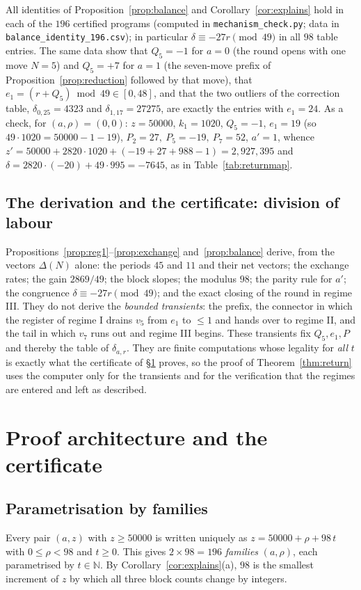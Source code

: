 \documentclass[11pt,a4paper]{article}
\theoremstyle{definition}
\newcommand{\N}{\mathbb{N}}
\begin{document}
All identities of Proposition~\ref{prop:balance} and Corollary~\ref{cor:explains} hold in each of the $196$ certified programs (computed in \texttt{mechanism\_check.py}; data in \texttt{balance\_identity\_196.csv}); in particular $\delta\equiv-27r\pmod{49}$ in all $98$ table entries. The same data show that $Q_5=-1$ for $a=0$ (the round opens with one move $N=5$) and $Q_5=+7$ for $a=1$ (the seven-move prefix of Proposition~\ref{prop:reduction} followed by that move), that $e_1=(r+Q_5)\bmod49\in[0,48]$, and that the two outliers of the correction table, $\delta_{0,25}=4323$ and $\delta_{1,17}=27275$, are exactly the entries with $e_1=24$. As a check, for $(a,\rho)=(0,0)$: $z=50000$, $k_1=1020$, $Q_5=-1$, $e_1=19$ (so $49\cdot1020=50000-1-19$), $P_2=27,\ P_5=-19,\ P_7=52$, $a'=1$, whence $z'=50000+2820\cdot1020+(-19+27+988-1)=2{,}927{,}395$ and $\delta=2820\cdot(-20)+49\cdot995=-7645$, as in Table~\ref{tab:returnmap}.

\subsection{The derivation and the certificate: division of labour}\label{subsec:limits-mech}
Propositions~\ref{prop:reg1}--\ref{prop:exchange} and~\ref{prop:balance} derive, from the vectors $\Delta(N)$ alone: the periods $45$ and $11$ and their net vectors; the exchange rates; the gain $2869/49$; the block slopes; the modulus $98$; the parity rule for $a'$; the congruence $\delta\equiv-27r\pmod{49}$; and the exact closing of the round in regime III. They do not derive the \emph{bounded transients}: the prefix, the connector in which the register of regime I drains $v_5$ from $e_1$ to $\le1$ and hands over to regime II, and the tail in which $v_7$ runs out and regime III begins. These transients fix $Q_5,e_1,P$ and thereby the table of $\delta_{a,r}$. They are finite computations whose legality for \emph{all} $t$ is exactly what the certificate of \S\ref{sec:proof} proves, so the proof of Theorem~\ref{thm:return} uses the computer only for the transients and for the verification that the regimes are entered and left as described.

\section{Proof architecture and the certificate}\label{sec:proof}

\subsection{Parametrisation by families}
Every pair $(a,z)$ with $z\ge50000$ is written uniquely as $z=50000+\rho+98\,t$ with $0\le\rho<98$ and $t\ge0$. This gives $2\times98=196$ \emph{families} $(a,\rho)$, each parametrised by $t\in\N$. By Corollary~\ref{cor:explains}(a), $98$ is the smallest increment of $z$ by which all three block counts change by integers.
\end{document}
